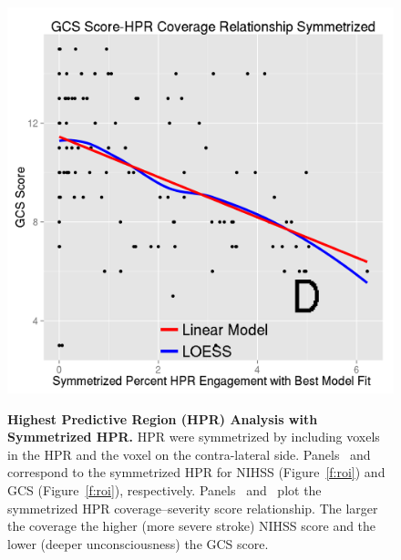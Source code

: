 \documentclass[10pt]{article}\usepackage[]{graphicx}\usepackage[]{color}
\begin{document}
\begin{figure}[H]
{ \includegraphics[width=.48\textwidth]{Regress_ROI_GCS_Best_Model_Symmetrized.png}  
 \label{pvals:reggcs_symm}
 } 
 \newline 
  \caption{{\bf Highest Predictive Region (HPR) Analysis with Symmetrized HPR.}  HPR were symmetrized by including voxels in the HPR and the voxel on the contra-lateral side.  Panels~\protect{} and~\protect{} correspond to the symmetrized HPR  for NIHSS (Figure~\ref{f:roi}\protect{}) and GCS (Figure~\ref{f:roi}\protect{}), respectively.  Panels~\protect{} and~\protect{} plot the symmetrized HPR coverage--severity score relationship.  The larger the coverage the higher (more severe stroke) NIHSS score and the lower (deeper unconsciousness) the GCS score.  
}
  \label{f:roi_symm}
\end{figure}
\end{document}
